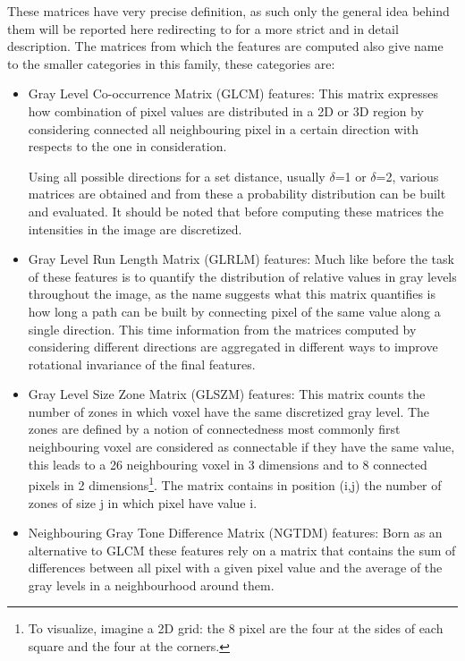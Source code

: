 \begin{enumerate}
These matrices have very precise definition, as such only the general idea behind them will be reported here redirecting to \cite{IBSI} for a more strict and in detail description. The matrices from which the features are computed also give name to the smaller categories in this family, these categories are:
	\begin{itemize}
		\item Gray Level Co-occurrence Matrix (GLCM) features: This matrix expresses how combination of pixel values are distributed in a 2D or 3D region by considering connected all neighbouring pixel in a certain direction with respects to the one in consideration.

Using all possible directions for a set distance, usually $\delta$=1 or $\delta$=2, various matrices are obtained and from these a probability distribution can be built and evaluated. It should be noted that before computing these matrices the intensities in the image are discretized.

		\item Gray Level Run Length Matrix (GLRLM) features: Much like before the task of these features is to quantify the distribution of relative values in gray levels throughout the image, as the name suggests what this matrix quantifies is how long a path can be built by connecting pixel of the same value along a single direction. This time information from the matrices computed by considering different directions are aggregated in different ways to improve rotational invariance of the final features.

		\item Gray Level Size Zone Matrix (GLSZM) features: This matrix counts the number of zones in which voxel have the same discretized gray level. The zones are defined by a notion of connectedness most commonly first neighbouring voxel are considered as connectable if they have the same value, this leads to a 26 neighbouring voxel in 3 dimensions and to 8 connected pixels in 2 dimensions\footnote{To visualize, imagine a 2D grid: the 8 pixel are the four at the sides of each square and the four at the corners.}. The matrix contains in position (i,j) the number of zones of size j in which pixel have value i.

		\item Neighbouring Gray Tone Difference Matrix (NGTDM) features: Born as an alternative to GLCM these features rely on a matrix that contains the sum of differences between all pixel with a given pixel value and the average of the gray levels in a neighbourhood around  them.


\end{itemize}
\end{enumerate}
